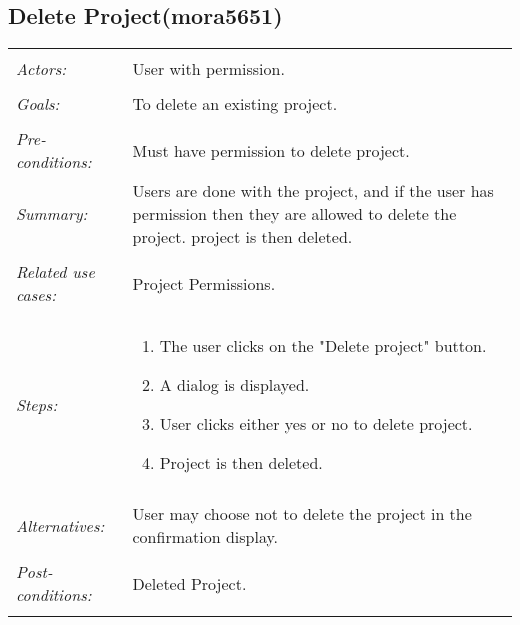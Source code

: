 \subsection{Delete Project(mora5651)}
\begin{tabular}{ p{2cm} p{12cm} }
\hline
\\
\textit{Actors:} & User with permission.\\
\\
\textit{Goals:} & To delete an existing project. \\
\\
\textit{Pre-conditions:} & Must have permission to delete project. 
\\
\textit{Summary:} & Users are done with the project, and if the user has permission then they are allowed to delete the project. project is then deleted. \\
\\
\textit{Related use cases:} & Project Permissions. \\
\\
\textit{Steps:} & \begin{enumerate}
 \item The user clicks on the "Delete project" button. 
 \item A dialog is displayed. 
 \item User clicks either yes or no to delete project. 
 \item Project is then deleted. 
 \end{enumerate}\\
 \\
 \textit{Alternatives:} & User may choose not to delete the project in the confirmation display.\\
 \\
 \textit{Post-conditions:} & Deleted Project. \\
 \\
\hline
\end{tabular}

